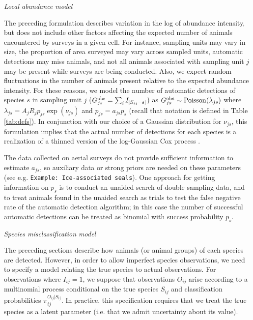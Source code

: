 \documentclass[12pt,fleqn]{article}
\begin{document}
\begin{flushleft}
\vspace{.15in}
{\it Local abundance model} \\
\vspace{.15in}

\hspace{.5in}The preceding formulation describes variation in the log of abundance intensity, but does not
include other factors affecting the expected number of animals encountered by surveys in a given cell.  For instance, sampling units may vary in size, the proportion of area surveyed may vary across sampled units, automatic detections may miss animals, and not all animals associated with sampling unit $j$ may be present while surveys are being conducted.  Also, we expect random fluctuations in the number of animals present relative to the expected abundance intensity.  For these reasons, we model the number of automatic detections of species $s$ in sampling unit $j$ ($G_{js}^{\rm obs}=\sum_i I_{[S_{ij}=s]}$) as $G_{js}^{\rm obs} \sim {\rm Poisson}(\lambda_{js})$ where $\lambda_{js}=A_j R_j p_{js} \exp(\nu_{js})$ and $p_{js}=a_{js}p_s$ (recall that notation is defined in Table \ref{tab:defs}).  In conjunction with our choice of a Gaussian distribution for $\nu_{js}$, this formulation implies that the actual number of detections for each species is a realization of a thinned version of the log-Gaussian Cox process \citep[see e.g.][]{RathbunCressie1994,MollerEtAl1998}.

\hspace{.5in}The data collected on aerial surveys do not provide sufficient information to estimate $a_{js}$, so auxiliary data or strong priors are needed on these parameters (see e.g. \texttt{Example: Ice-associated seals}).  One approach for getting information on $p_s$ is to conduct an unaided search of double sampling data, and to treat animals found in the unaided search as trials to test the false negative rate of the automatic detection algorithm; in this case the number of successful automatic detections can be treated as binomial with success probability $p_s$.

\vspace{.15in}
{\it Species misclassification model} \\
\vspace{.15in}

\hspace{.5in}The preceding sections describe how animals (or animal groups) of each species are detected.  However, in order to allow imperfect species observations, we need to specify a model relating the true species to actual observations.  For observations where $I_{ij}=1$, we suppose that observations $O_{ij}$ arise according to a multinomial process conditional on the
true species $S_{ij}$ and classification probabilities $\pi_{ij}^{O_{ij}|S_{ij}}$.  In practice, this specification requires that we treat the true species as a latent parameter (i.e. that we admit uncertainty about its value).


\end{flushleft}
\end{document}

